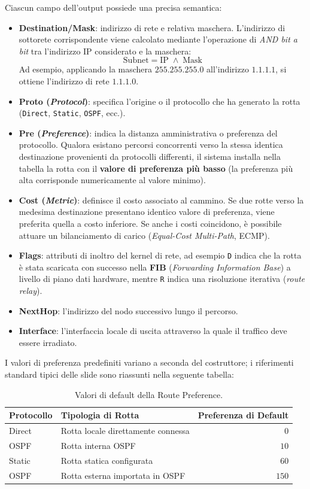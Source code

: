 \documentclass[11pt, a4paper]{article}
\begin{document}
Ciascun campo dell'output possiede una precisa semantica:
\begin{itemize}
    \item \textbf{Destination/Mask}: indirizzo di rete e relativa maschera. L'indirizzo di sottorete corrispondente viene calcolato mediante l'operazione di \emph{AND bit a bit} tra l'indirizzo IP considerato e la maschera:
    \[
        \text{Subnet} = \text{IP} \;\land\; \text{Mask}
    \]
    Ad esempio, applicando la maschera $255.255.255.0$ all'indirizzo $1.1.1.1$, si ottiene l'indirizzo di rete $1.1.1.0$.
    \item \textbf{Proto (\emph{Protocol})}: specifica l'origine o il protocollo che ha generato la rotta (\texttt{Direct}, \texttt{Static}, \texttt{OSPF}, ecc.).
    \item \textbf{Pre (\emph{Preference})}: indica la distanza amministrativa o preferenza del protocollo. Qualora esistano percorsi concorrenti verso la stessa identica destinazione provenienti da protocolli differenti, il sistema installa nella tabella la rotta con il \textbf{valore di preferenza più basso} (la preferenza più alta corrisponde numericamente al valore minimo).
    \item \textbf{Cost (\emph{Metric})}: definisce il costo associato al cammino. Se due rotte verso la medesima destinazione presentano identico valore di preferenza, viene preferita quella a costo inferiore. Se anche i costi coincidono, è possibile attuare un bilanciamento di carico (\emph{Equal-Cost Multi-Path}, ECMP).
    \item \textbf{Flags}: attributi di inoltro del kernel di rete, ad esempio \texttt{D} indica che la rotta è stata scaricata con successo nella \textbf{FIB} (\emph{Forwarding Information Base}) a livello di piano dati hardware, mentre \texttt{R} indica una risoluzione iterativa (\emph{route relay}).
    \item \textbf{NextHop}: l'indirizzo del nodo successivo lungo il percorso.
    \item \textbf{Interface}: l'interfaccia locale di uscita attraverso la quale il traffico deve essere irradiato.
\end{itemize}

I valori di preferenza predefiniti variano a seconda del costruttore; i riferimenti standard tipici delle slide sono riassunti nella seguente tabella:

\begin{table}[H]
\centering
\caption{Valori di default della Route Preference.}
\label{tab:route_preference}
\begin{tabular}{llr}
\toprule
\textbf{Protocollo} & \textbf{Tipologia di Rotta} & \textbf{Preferenza di Default} \\
\midrule
Direct & Rotta locale direttamente connessa & $0$ \\
OSPF & Rotta interna OSPF & $10$ \\
Static & Rotta statica configurata & $60$ \\
OSPF & Rotta esterna importata in OSPF & $150$ \\
\bottomrule
\end{tabular}
\end{table}
\end{document}
